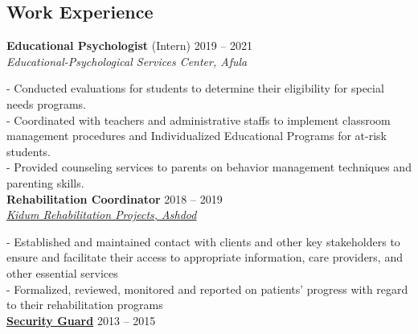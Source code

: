 \documentclass[
	12pt,a4paper %
]{article}
\newcommand{\jobentry}[5]{
	{\raggedleft\textsc{#1\expandafter\ifstrequal\expandafter{#2}{}{}{\hspace{6pt}\footnotesize{(#2)}}}\par} %
	\expandafter\ifstrequal\expandafter{#3}{}{}{{\raggedright\large #3}\\} %
	\expandafter\ifstrequal\expandafter{#4}{}{}{{\raggedright\large\textit{\textbf{#4}}}\\[4pt]} %
	\expandafter\ifstrequal\expandafter{#5}{}{}{#5} %
	\medskip %
}
\begin{document}
\begin{paracol}{2}
\section{Work Experience}





\textbf{\large Educational Psychologist} (Intern) \hfill 2019 -- 2021 \\
\large \textit{Educational-Psychological Services Center, Afula}

\normalsize- Conducted evaluations for students to determine their eligibility for special needs programs.
\\
- Coordinated with teachers and administrative staffs to implement classroom management procedures and Individualized Educational Programs for at-risk students.
\\
- Provided counseling services to parents on behavior management techniques and parenting skills. \\

\textbf{\large Rehabilitation Coordinator} \hfill 2018 -- 2019 \\
\href{http://www.kidumpro.co.il/}{\large \textit{Kidum Rehabilitation Projects, Ashdod}}

- Established and maintained contact with clients and other key stakeholders to ensure and facilitate their access to appropriate information, care providers, and other essential services \\
- Formalized, reviewed, monitored and reported on patients' progress with regard to their rehabilitation programs \\

\href{https://loona-il.000webhostapp.com/resume-references/recommendation-letter-security-guard.jpg}{\large \textbf{Security Guard}} \hfill 2013 -- 2015


\end{paracol}
\end{document}
